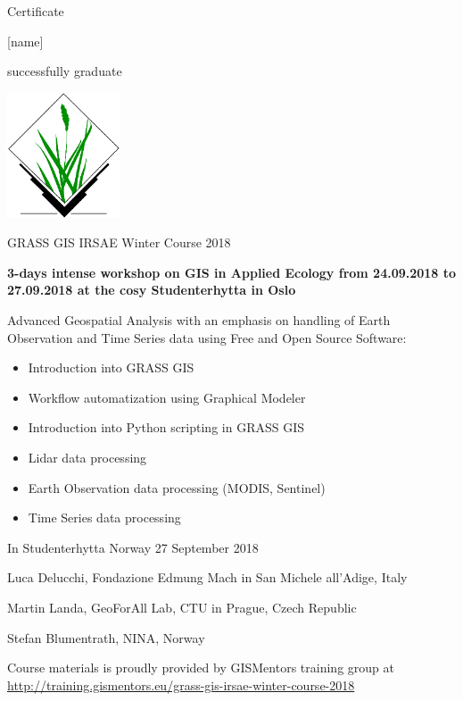 \documentclass[12pt, a4paper]{letter}
\begin{document}
\pagestyle{empty}
\begin{center}

{\Huge Certificate}

{\Large [name]}

successfully graduate

\includegraphics[width=0.25\textwidth]{./grasslogo_vector.pdf}

{\Large GRASS GIS IRSAE Winter Course 2018}

{\bf 3-days intense workshop on GIS in Applied Ecology from 24.09.2018 to
27.09.2018 at the cosy Studenterhytta in Oslo}
\end{center}

Advanced Geospatial Analysis with an emphasis on handling of Earth
Observation and Time Series data using Free and Open Source Software:

\begin{itemize}
    \item Introduction into GRASS GIS
    \item Workflow automatization using Graphical Modeler
    \item Introduction into Python scripting in GRASS GIS
    \item Lidar data processing
    \item Earth Observation data processing (MODIS, Sentinel)
    \item Time Series data processing
\end{itemize}

\vfill

    In Studenterhytta Norway 27 September 2018\\

\vfill

    Luca Delucchi, Fondazione Edmung Mach in San Michele all’Adige, Italy

\vfill
    
    Martin Landa, GeoForAll Lab, CTU in Prague, Czech Republic
    
\vfill

    Stefan Blumentrath, NINA, Norway \\

\vfill

\begin{center}
{\footnotesize Course materials is proudly provided by GISMentors
  training group at
  \url{http://training.gismentors.eu/grass-gis-irsae-winter-course-2018}}
\end{center}
\end{document}
